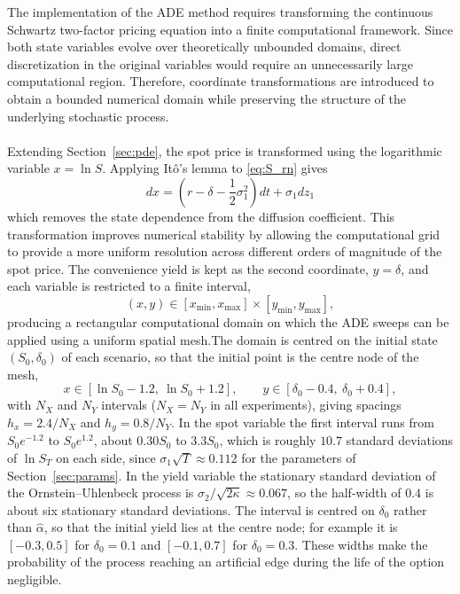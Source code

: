 \documentclass[12pt,a4paper]{article}
\begin{document}
The implementation of the ADE method requires transforming the continuous Schwartz two-factor pricing equation into a finite computational framework. Since both state variables evolve over theoretically unbounded domains, direct discretization in the original variables would require an unnecessarily large computational region. Therefore, coordinate transformations are introduced to obtain a bounded numerical domain while preserving the structure of the underlying stochastic process.\\\\
Extending Section~\ref{sec:pde}, the spot price is transformed using the logarithmic variable $x=\ln S$. Applying It\^o's lemma to \eqref{eq:S_rn} gives
\begin{equation}
 dx=\left(r-\delta-\frac{1}{2}\sigma_1^2\right)dt+\sigma_1dz_1
\end{equation}
which removes the state dependence from the diffusion coefficient. This transformation improves numerical stability by allowing the computational grid to provide a more uniform resolution across different orders of magnitude of the spot price. The convenience yield is kept as the second coordinate, $y=\delta$, and each variable is restricted to a finite interval,
\[
(x,y)\in[x_{\min},x_{\max}]\times[y_{\min},y_{\max}],
\]
producing a rectangular computational domain on which the ADE sweeps can be applied using a uniform spatial mesh.The domain is centred on the initial state $(S_0,\delta_0)$ of each scenario, so that the initial point is the centre node of the mesh,
\begin{equation}
x\in[\ln S_0-1.2,\ \ln S_0+1.2],\qquad y\in[\delta_0-0.4,\ \delta_0+0.4],
\end{equation}
with $N_X$ and $N_Y$ intervals ($N_X=N_Y$ in all experiments), giving spacings $h_x=2.4/N_X$ and $h_y=0.8/N_Y$. In the spot variable the first interval runs from $S_0e^{-1.2}$ to $S_0e^{1.2}$, about $0.30S_0$ to $3.3S_0$, which is roughly $10.7$ standard deviations of $\ln S_T$ on each side, since $\sigma_1\sqrt{T}\approx0.112$ for the parameters of Section~\ref{sec:params}. In the yield variable the stationary standard deviation of the Ornstein--Uhlenbeck process is $\sigma_2/\sqrt{2\kappa}\approx0.067$, so the half-width of $0.4$ is about six stationary standard deviations. The interval is centred on $\delta_0$ rather than $\hat\alpha$, so that the initial yield lies at the centre node; for example it is $[-0.3,0.5]$ for $\delta_0=0.1$ and $[-0.1,0.7]$ for $\delta_0=0.3$. These widths make the probability of the process reaching an artificial edge during the life of the option negligible.
\end{document}

